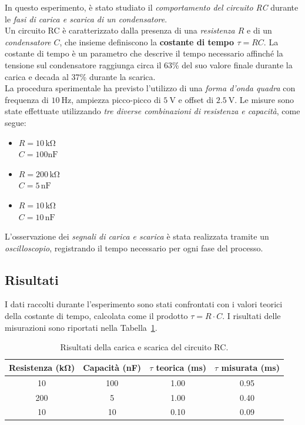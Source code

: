 \documentclass[a4paper,10pt]{article}
\begin{document}
\begin{multicols}{2}
In questo esperimento, è stato studiato il \textit{comportamento del circuito RC} durante le \textit{fasi di carica e scarica di un condensatore}.\\
Un circuito RC è caratterizzato dalla presenza di una \textit{resistenza \( R \)} e di un \textit{condensatore \( C \)}, che insieme definiscono la \textbf{costante di tempo \(\tau = RC\)}. La costante di tempo è un parametro che descrive il tempo necessario affinché la tensione sul condensatore raggiunga circa il 63\% del suo valore finale durante la carica e decada al 37\% durante la scarica. \\
La procedura sperimentale ha previsto l'utilizzo di una \textit{forma d'onda quadra} con frequenza di \(\SI{10}{\hertz}\), ampiezza picco-picco di \(\SI{5}{\volt}\) e offset di \(\SI{2.5}{\volt}\). Le misure sono state effettuate utilizzando \textit{tre diverse combinazioni di resistenza e capacità}, come segue:
\begin{itemize}
    \item \( R = 10 \, \mathrm{k\Omega} \) \\ \( C = 100 \mathrm{nF} \)
    \item \( R = 200 \, \mathrm{k\Omega} \) \\ \( C = 5 \, \mathrm{nF} \)
    \item \( R = 10 \, \mathrm{k\Omega} \) \\ \( C = 10 \, \mathrm{nF} \)
\end{itemize}
L'osservazione dei \textit{segnali di carica e scarica} è stata realizzata tramite un \textit{oscilloscopio}, registrando il tempo necessario per ogni fase del processo.
\end{multicols}

\subsection{Risultati}
I dati raccolti durante l'esperimento sono stati confrontati con i valori teorici della costante di tempo, calcolata come il prodotto \( \tau = R \cdot C \). I risultati delle misurazioni sono riportati nella Tabella~\ref{tab:rc_charge_discharge}.

\begin{table}[H]
\centering
\begin{tabular}{|c|c|c|c|}
\hline
\textbf{Resistenza (\si{\kilo\ohm})} & \textbf{Capacità (\si{\nano\farad})} & \textbf{\(\tau\) teorica (\si{\milli\second})} & \textbf{\(\tau\) misurata (\si{\milli\second})} \\ \hline
10 & 100 & 1.00 & 0.95 \\ \hline
200 & 5 & 1.00 & 0.40 \\ \hline
10 & 10 & 0.10 & 0.09 \\ \hline
\end{tabular}
\caption{Risultati della carica e scarica del circuito RC.}
\label{tab:rc_charge_discharge}
\end{table}
\end{document}
